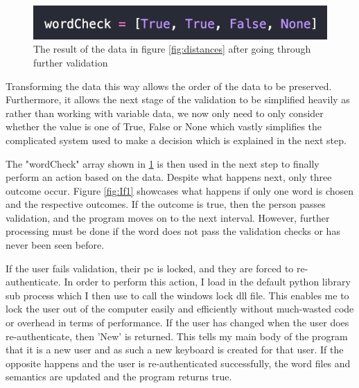 \documentclass[10pt,a4paper]{report}
\begin{document}
\begin{figure}[h]
	\centering
	\includegraphics{WordCheck}
	\caption{The result of the data in figure \ref{fig:distances} after going through further validation}
	\label{fig:wordCheck}
\end{figure}

Transforming the data this way allows the order of the data to be preserved. Furthermore, it allows the next stage of the validation to be simplified heavily as rather than working with variable data, we now only need to only consider whether the value is one of True, False or None which vastly simplifies the complicated system used to make a decision which is explained in the next step.

The "wordCheck" array shown in \ref{fig:wordCheck} is then used in the next step to finally perform an action based on the data. Despite what happens next, only three outcome occur. Figure \ref{fig:If1} showcases what happens if only one word is chosen and the respective outcomes. If the outcome is true, then the person passes validation, and the program moves on to the next interval. However, further processing  must be done if the word does not pass the validation checks or has never been seen before.

If the user fails validation, their pc is locked, and they are forced to re-authenticate. In order to perform this action, I load in the default python library sub process \cite{subprocess} which I then use to call the windows lock dll file. This enables me to lock the user out of the computer easily and efficiently without much-wasted code or overhead in terms of performance. If the user has changed when the user does re-authenticate, then 'New' is returned. This tells my main body of the program that it is a new user and as such a new keyboard is created for that user. If the opposite happens and the user is re-authenticated successfully, the word files and semantics are updated and the program returns true.
\end{document}
